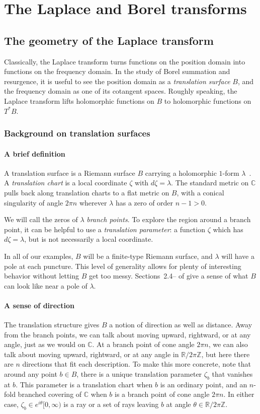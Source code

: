 \documentclass{article}
\newcommand{\Z}{\mathbb{Z}}
\newcommand{\R}{\mathbb{R}}
\newcommand{\C}{\mathbb{C}}
\theoremstyle{definition}
\theoremstyle{plain}
\begin{document}
\section{The Laplace and Borel transforms}\label{sec:Laplace-Borel-general}
\subsection{The geometry of the Laplace transform}\label{sec:geometry_laplace}
Classically, the Laplace transform turns functions on the position domain into functions on the frequency domain. In the study of Borel summation and resurgence, it is useful to see the position domain as a {\em translation surface} $B$, and the frequency domain as one of its cotangent spaces. Roughly speaking, the Laplace transform lifts holomorphic functions on $B$ to holomorphic functions on $T^*B$.
%
\subsubsection{Background on translation surfaces}\label{sec:transl}
%
\paragraph{A brief definition}
%
A translation surface is a Riemann surface $B$ carrying a holomorphic $1$-form $\lambda$~\cite{zorich2006flat}. A {\em translation chart} is a local coordinate $\zeta$ with $d\zeta = \lambda$. The standard metric on $\C$ pulls back along translation charts to a flat metric on $B$, with a conical singularity of angle $2\pi n$ wherever $\lambda$ has a zero of order $n-1 > 0$.

We will call the zeros of $\lambda$ {\em branch points}. To explore the region around a branch point, it can be helpful to use a {\em translation parameter}: a function $\zeta$ which has $d\zeta = \lambda$, but is not necessarily a local coordinate.

In all of our examples, $B$ will be a finite-type Riemann surface, and $\lambda$ will have a pole at each puncture. This level of generality allows for plenty of interesting behavior without letting $B$ get too messy. Sections~2.4\;-- of \cite{gupta2013meromorphic} give a sense of what $B$ can look like near a pole of $\lambda$.
%
\paragraph{A sense of direction}
%
The translation structure gives $B$ a notion of direction as well as distance. Away from the branch points, we can talk about moving upward, rightward, or at any angle, just as we would on $\C$. At a branch point of cone angle $2\pi n$, we can also talk about moving upward, rightward, or at any angle in $\R/2\pi\Z$, but here there are $n$ directions that fit each description. To make this more concrete, note that around any point $b \in B$, there is a unique translation parameter $\zeta_b$ that vanishes at $b$. This parameter is a translation chart when $b$ is an ordinary point, and an $n$-fold branched covering of $\C$ when $b$ is a branch point of cone angle $2\pi n$. In either case, $\zeta_b \in e^{i\theta} [0, \infty)$ is a ray or a set of rays leaving $b$ at angle $\theta \in \R/2\pi\Z$.
\end{document}
